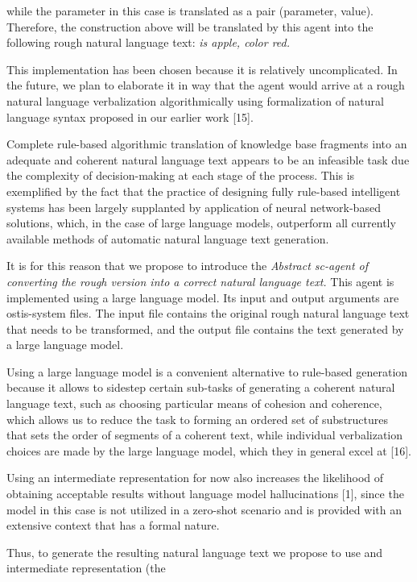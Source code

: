 \documentclass[twocolumn]{scndocument}
\begin{document}
while the parameter in this case is translated as a pair
(parameter, value). Therefore, the construction above will
be translated by this agent into the following rough
natural language text:\textit{ is apple, color red.}
\par This implementation has been chosen because it is relatively uncomplicated. In the future, we plan to elaborate it in way that the agent would arrive at a rough natural language verbalization algorithmically using formalization of natural language syntax proposed in our earlier work [15].
\par Complete rule-based algorithmic translation of knowledge base fragments into an adequate and coherent natural language text appears to be an infeasible task due the complexity of decision-making at each stage of the process. This is exemplified by the fact that the practice of designing fully rule-based intelligent systems has been largely supplanted by application of neural network-based
\newpage \noindent solutions, which, in the case of large language models,
outperform all currently available methods of automatic natural language text generation.
\par It is for this reason that we propose to introduce the \textit{Abstract sc-agent of converting the rough version into a
correct natural language text.} This agent is implemented
using a large language model. Its input and output
arguments are ostis-system files. The input file contains
the original rough natural language text that needs to
be transformed, and the output file contains the text
generated by a large language model.
\par Using a large language model is a convenient alternative to rule-based generation because it allows to sidestep
certain sub-tasks of generating a coherent natural language text, such as choosing particular means of cohesion and coherence, which allows us to reduce the task to forming an ordered set of substructures that sets the order of segments of a coherent text, while individual verbalization choices are made by the large language model, which they in general excel at [16].
\par Using an intermediate representation for now also
increases the likelihood of obtaining acceptable results
without language model hallucinations [1], since the
model in this case is not utilized in a zero-shot scenario
and is provided with an extensive context that has a
formal nature.
\par Thus, to generate the resulting natural language text
we propose to use and intermediate representation (the
\end{document}
